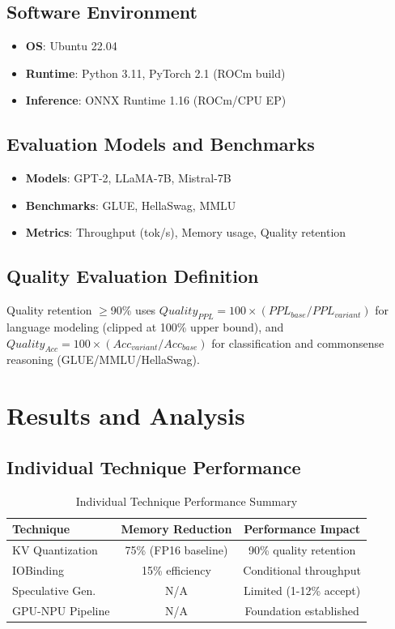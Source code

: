 \documentclass[twocolumn,10pt]{article}
\begin{document}
\subsection{Software Environment}
\begin{itemize}
\item \textbf{OS}: Ubuntu 22.04
\item \textbf{Runtime}: Python 3.11, PyTorch 2.1 (ROCm build)
\item \textbf{Inference}: ONNX Runtime 1.16 (ROCm/CPU EP)
\end{itemize}

\subsection{Evaluation Models and Benchmarks}
\begin{itemize}
\item \textbf{Models}: GPT-2, LLaMA-7B, Mistral-7B
\item \textbf{Benchmarks}: GLUE, HellaSwag, MMLU
\item \textbf{Metrics}: Throughput (tok/s), Memory usage, Quality retention
\end{itemize}

\subsection{Quality Evaluation Definition}

Quality retention $\geq$90\% uses $Quality_{PPL} = 100 \times (PPL_{base} / PPL_{variant})$ for language modeling (clipped at 100\% upper bound), and $Quality_{Acc} = 100 \times (Acc_{variant} / Acc_{base})$ for classification and commonsense reasoning (GLUE/MMLU/HellaSwag).

\section{Results and Analysis}

\subsection{Individual Technique Performance}

\begin{table}[h]
\centering
\begin{tabular}{lcc}
\toprule
Technique & Memory Reduction & Performance Impact \\
\midrule
KV Quantization & 75\% (FP16 baseline) & 90\% quality retention \\
IOBinding & 15\% efficiency & Conditional throughput \\
Speculative Gen. & N/A & Limited (1-12\% accept) \\
GPU-NPU Pipeline & N/A & Foundation established \\
\bottomrule
\end{tabular}
\caption{Individual Technique Performance Summary}
\end{table}
\end{document}
